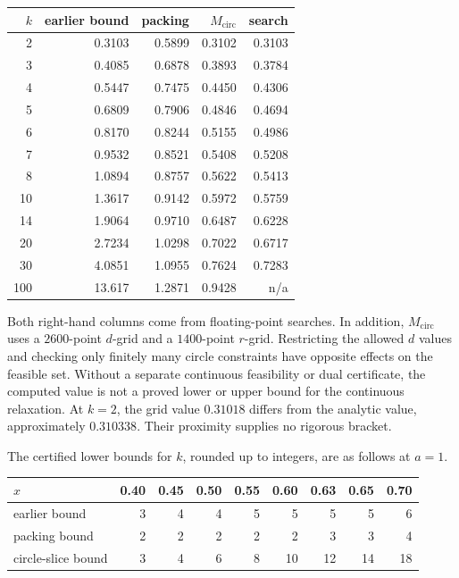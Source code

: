 \documentclass[11pt]{article}
\begin{document}
\begin{center}
\begin{tabular}{@{}rrrrr@{}}
\toprule
$k$ & earlier bound & packing & $M_{\mathrm{circ}}$ & search \\
\midrule
2 & 0.3103 & 0.5899 & 0.3102 & 0.3103 \\
3 & 0.4085 & 0.6878 & 0.3893 & 0.3784 \\
4 & 0.5447 & 0.7475 & 0.4450 & 0.4306 \\
5 & 0.6809 & 0.7906 & 0.4846 & 0.4694 \\
6 & 0.8170 & 0.8244 & 0.5155 & 0.4986 \\
7 & 0.9532 & 0.8521 & 0.5408 & 0.5208 \\
8 & 1.0894 & 0.8757 & 0.5622 & 0.5413 \\
10 & 1.3617 & 0.9142 & 0.5972 & 0.5759 \\
14 & 1.9064 & 0.9710 & 0.6487 & 0.6228 \\
20 & 2.7234 & 1.0298 & 0.7022 & 0.6717 \\
30 & 4.0851 & 1.0955 & 0.7624 & 0.7283 \\
100 & 13.617 & 1.2871 & 0.9428 & n/a \\
\bottomrule
\end{tabular}
\end{center}

Both right-hand columns come from floating-point searches. In addition,
$M_{\mathrm{circ}}$ uses a $2600$-point $d$-grid and a $1400$-point
$r$-grid. Restricting the allowed $d$ values and checking only finitely
many circle constraints have opposite effects on the feasible set.
Without a separate continuous feasibility or dual certificate, the
computed value is not a proved lower or upper bound for the continuous
relaxation. At $k=2$, the grid value $0.31018$ differs from the analytic
value, approximately $0.310338$. Their proximity supplies no rigorous
bracket.

The certified lower bounds for $k$, rounded up to integers, are as
follows at $a=1$.

\begin{center}
\begin{tabular}{@{}lrrrrrrrr@{}}
\toprule
$x$ & 0.40 & 0.45 & 0.50 & 0.55 & 0.60 & 0.63 & 0.65 & 0.70 \\
\midrule
earlier bound & 3 & 4 & 4 & 5 & 5 & 5 & 5 & 6 \\
packing bound & 2 & 2 & 2 & 2 & 2 & 3 & 3 & 4 \\
circle-slice bound & 3 & 4 & 6 & 8 & 10 & 12 & 14 & 18 \\
\bottomrule
\end{tabular}
\end{center}
\end{document}
